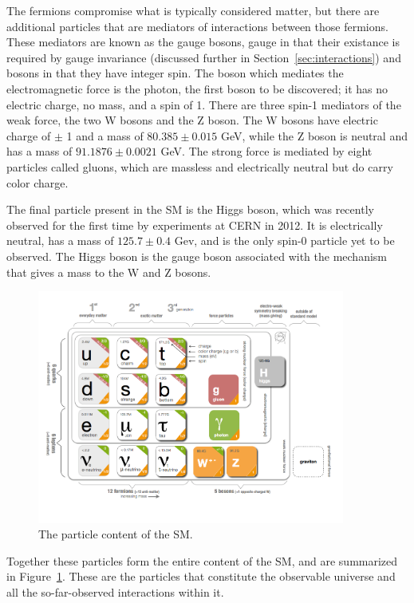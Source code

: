 The fermions compromise what is typically considered matter, but there are additional particles that are mediators of interactions between those fermions.
These mediators are known as the gauge bosons, gauge in that their existance is required by gauge invariance (discussed further in Section~\ref{sec:interactions}) and bosons in that they have integer spin.
The boson which mediates the electromagnetic force is the photon, the first boson to be discovered; it has no electric charge, no mass, and a spin of 1.
There are three spin-1 mediators of the weak force, the two W bosons and the Z boson. 
The W bosons have electric charge of $\pm$ 1 and a mass of $80.385 \pm 0.015$ GeV, while the Z boson is neutral and has a mass of $91.1876 \pm 0.0021$ GeV. 
The strong force is mediated by eight particles called gluons, which are massless and electrically neutral but do carry color charge. 

The final particle present in the \ac{SM} is the Higgs boson, which was recently observed for the first time by experiments at CERN in 2012. 
It is electrically neutral, has a mass of $125.7 \pm 0.4$ Gev, and is the only spin-0 particle yet to be observed. 
The Higgs boson is the gauge boson associated with the mechanism that gives a mass to the W and Z bosons.

\begin{figure}[h]
  \centering
  \includegraphics[width=0.9\textwidth]{figures/particle_content.png}
  \caption{The particle content of the \ac{SM}.}
  \label{fig:particle_content}
\end{figure}

Together these particles form the entire content of the \ac{SM}, and are summarized in Figure~\ref{fig:particle_content}. These are the particles that constitute the observable universe and all the so-far-observed interactions within it.


